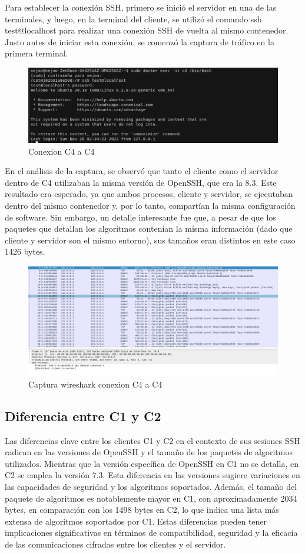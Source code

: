 \documentclass[letter,12pt]{article}
\begin{document}
Para establecer la conexión SSH, primero se inició el servidor en una de las terminales, y luego, en la terminal del cliente, se utilizó el comando ssh test@localhost para realizar una conexión SSH de vuelta al mismo contenedor. Justo antes de iniciar esta conexión, se comenzó la captura de tráfico en la primera terminal.
\begin{figure}[H]
        \centering
        \includegraphics[width=1\textwidth]{img/conexion_c4.png}    
        \caption{Conexion C4 a C4}
    \end{figure}
En el análisis de la captura, se observó que tanto el cliente como el servidor dentro de C4 utilizaban la misma versión de OpenSSH, que era la 8.3. Este resultado era esperado, ya que ambos procesos, cliente y servidor, se ejecutaban dentro del mismo contenedor y, por lo tanto, compartían la misma configuración de software. Sin embargo, un detalle interesante fue que, a pesar de que los paquetes que detallan los algoritmos contenían la misma información (dado que cliente y servidor son el mismo entorno), sus tamaños eran distintos en este caso 1426 bytes.
\begin{figure}[H]
        \centering
        \includegraphics[width=1\textwidth]{img/wireshar_c4.png}    
        \caption{Captura wireshark conexion C4 a C4}
    \end{figure}
\subsection{Diferencia entre C1 y C2}
Las diferencias clave entre los clientes C1 y C2 en el contexto de sus sesiones SSH radican en las versiones de OpenSSH y el tamaño de los paquetes de algoritmos utilizados. Mientras que la versión específica de OpenSSH en C1 no se detalla, en C2 se emplea la versión 7.3. Esta diferencia en las versiones sugiere variaciones en las capacidades de seguridad y los algoritmos soportados. Además, el tamaño del paquete de algoritmos es notablemente mayor en C1, con aproximadamente 2034 bytes, en comparación con los 1498 bytes en C2, lo que indica una lista más extensa de algoritmos soportados por C1. Estas diferencias pueden tener implicaciones significativas en términos de compatibilidad, seguridad y la eficacia de las comunicaciones cifradas entre los clientes y el servidor.
\end{document}
